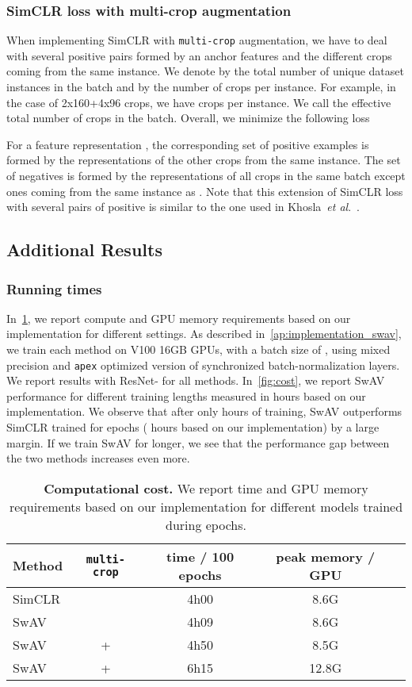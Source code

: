 \documentclass{article}
\def\onedot{.}
\def\etal{\emph{et al}\onedot}
\def\OURS{SwAV\xspace}
\begin{document}
\subsubsection{SimCLR loss with multi-crop augmentation}
When implementing SimCLR with \texttt{multi-crop} augmentation, we have to deal with several positive pairs formed by an anchor features and the different crops coming from the same instance.
We denote by  the total number of unique dataset instances in the batch and by  the number of crops per instance.
For example, in the case of 2x160+4x96 crops, we have  crops per instance.
We call  the effective total number of crops in the batch.
Overall, we minimize the following loss

For a feature representation , the corresponding set of positive examples  is formed by the representations of the other crops from the same instance.
The set of negatives  is formed by the representations of all crops in the same batch except ones coming from the same instance as .
Note that this extension of SimCLR loss with several pairs of positive is similar to the one used in Khosla~\etal~\cite{khosla2020supervised}.

\subsection{Additional Results}
\label{ap:results}

\subsubsection{Running times}
In~\cref{tab:cost}, we report compute and GPU memory requirements based on our implementation for different settings.
As described in~\cref{ap:implementation_swav}, we train each method on  V100 16GB GPUs, with a batch size of , using mixed precision and \texttt{apex} optimized version of synchronized batch-normalization layers.
We report results with ResNet- for all methods.
In~\cref{fig:cost}, we report \OURS performance for different training lengths measured in hours based on our implementation.
We observe that after only  hours of training, \OURS outperforms SimCLR trained for  epochs ( hours based on our implementation) by a large margin.
If we train \OURS for longer, we see that the performance gap between the two methods increases even more.

\begin{table}[h]
  \caption{
\textbf{Computational cost.} We report time and GPU memory requirements based on our implementation for different models trained during  epochs.
}
\vspace{.3em}
  \label{tab:cost}
\centering
\begin{tabular}{l c c c c}
    \toprule
	  Method & \texttt{multi-crop} & time / 100 epochs & peak memory / GPU \\
    \midrule
	SimCLR &  & 4h00 & 8.6G \\
	\OURS &  & 4h09 & 8.6G \\
	\OURS &  +  & 4h50 & 8.5G \\
	\OURS &  +  & 6h15 & 12.8G \\
    \bottomrule
  \end{tabular}
\end{table}
\end{document}
